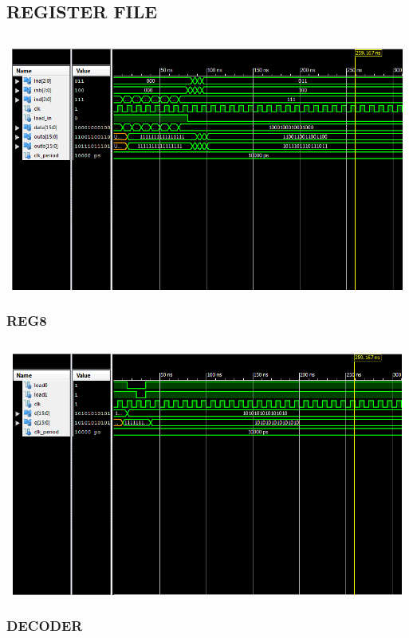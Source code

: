 \documentclass{article}
\begin{document}
\subsection{REGISTER FILE}\label{sec:result}

\begin{lstlisting}

\end{lstlisting}

\includegraphics[width=16cm, height=8cm]{test_register_file.png}
\pagebreak

\subsubsection{REG8}\label{sec:result}

\begin{lstlisting}

\end{lstlisting}
\includegraphics[width=16cm, height=8cm]{test_reg8.png}
\pagebreak
\subsubsection{DECODER}\label{sec:result}
\end{document}
